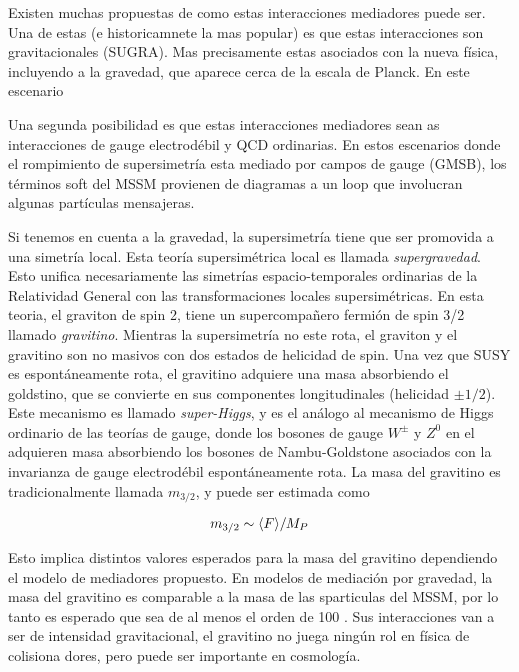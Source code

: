 \begin{figure}[h]
  \centering
  
\end{figure}

Existen muchas propuestas de como estas interacciones
mediadores puede ser. Una de estas (e historicamnete la mas popular)
es que estas interacciones son gravitacionales (SUGRA). Mas precisamente
estas asociados con la nueva física, incluyendo a la gravedad, que
aparece cerca de la escala de Planck. En este escenario

Una segunda posibilidad es que estas interacciones mediadores sean
as interacciones de gauge electrodébil y QCD ordinarias. En estos
escenarios donde el rompimiento de supersimetría esta mediado por
campos de gauge (GMSB), los términos soft del MSSM provienen de
diagramas a un loop que involucran algunas partículas mensajeras.

Si tenemos en cuenta a la gravedad, la supersimetría tiene que ser
promovida a una simetría local. Esta teoría supersimétrica local
es llamada \emph{supergravedad}. Esto unifica necesariamente las
simetrías espacio-temporales ordinarias de la Relatividad General
con las transformaciones locales supersimétricas. En esta teoria,
el graviton de spin 2, tiene un supercompa\~nero fermión de spin 3/2
llamado \emph{gravitino}. Mientras la supersimetría no este rota,
el graviton y el gravitino son no masivos con dos estados de helicidad
de spin. Una vez que SUSY es espontáneamente rota, el gravitino adquiere
una masa absorbiendo el goldstino, que se convierte en sus componentes
longitudinales (helicidad $\pm 1/2$). Este mecanismo es llamado \emph{super-Higgs},
y es el análogo al mecanismo de Higgs ordinario de las teorías de gauge,
donde los bosones de gauge $W^\pm$ y $Z^0$ en el {\SM} adquieren
masa absorbiendo los bosones de Nambu-Goldstone asociados con la
invarianza de gauge electrodébil espontáneamente rota. La masa del
gravitino es tradicionalmente llamada $m_{3/2}$, y puede ser estimada
como

\begin{equation}
  m_{3/2} \sim \langle F \rangle / M_P
\end{equation}

Esto implica distintos valores esperados para la masa del gravitino
dependiendo el modelo de mediadores propuesto. En modelos de mediación
por gravedad, la masa del gravitino es comparable a la masa de las
sparticulas del MSSM, por lo tanto es esperado que sea de al menos
el orden de 100 \gev. Sus interacciones van a ser de intensidad
gravitacional, el gravitino no juega ningún rol en física de
colisiona dores, pero puede ser importante en cosmología.

